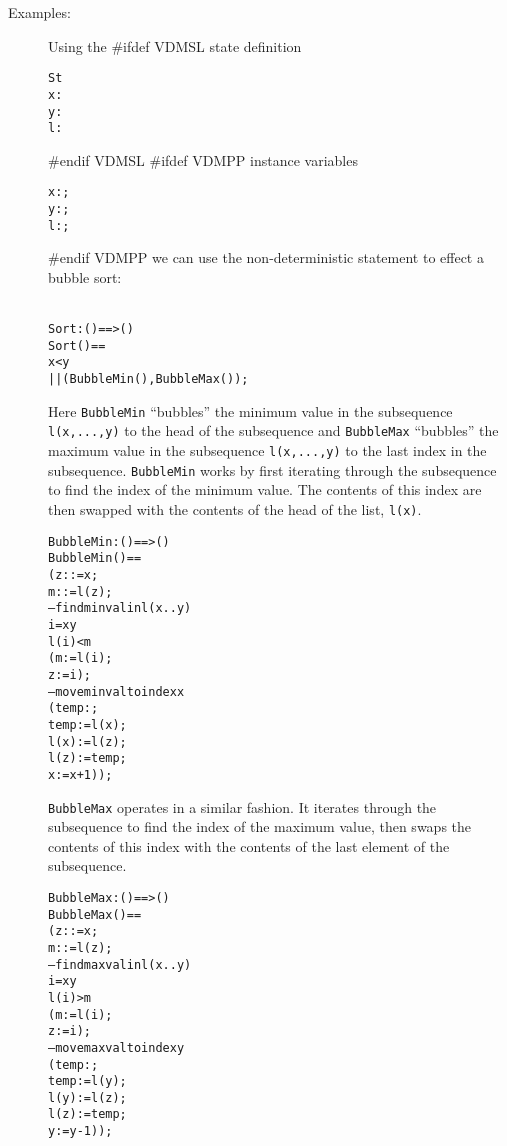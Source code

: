 \documentclass[\pformat,12pt]{article}
\begin{document}
\begin{description}
\item[Examples:] Using the 
#ifdef VDMSL
state definition
  \begin{alltt}
   St 
    x:
    y:
    l:
  \end{alltt}
#endif VDMSL
#ifdef VDMPP
instance variables
  \begin{alltt}
    x:;
    y:;
    l:;
  \end{alltt}
#endif VDMPP
  we can use the non-deterministic statement to effect a bubble sort:
  \begin{alltt}\label{sortDef}
  Sort: () ==> ()
  Sort () ==
     x < y 
      ||(BubbleMin(), BubbleMax());
  \end{alltt}
  Here \texttt{BubbleMin} ``bubbles'' the minimum value in the
  subsequence \texttt{l(x,...,y)} to the head of the subsequence and
  \texttt{BubbleMax} ``bubbles'' the maximum value in the subsequence
  \texttt{l(x,...,y)} to the last index in the
  subsequence. \texttt{BubbleMin} works by first iterating through the
  subsequence to find the index of the minimum value. The contents of
  this index are then swapped with the contents of the head of the
  list, \texttt{l(x)}.
  \begin{alltt}
  BubbleMin : () ==> ()
  BubbleMin () ==
    ( z: := x;
      m: := l(z);
     -- find min val in l(x..y)
      i = x  y 
        l(i) < m
        ( m := l(i);
              z := i);
     -- move min val to index x
     ( temp:;
      temp := l(x);
      l(x) := l(z);
      l(z) := temp;
      x := x+1));
\end{alltt}
\texttt{BubbleMax} operates in a similar fashion. It iterates through the
  subsequence to find the index of the maximum value, then swaps the
  contents of this index with the contents of the last element of the
  subsequence. 
\begin{alltt}
  BubbleMax : () ==> ()
  BubbleMax () ==
    ( z: := x;
      m: := l(z);
     -- find max val in l(x..y)
      i = x  y 
        l(i) > m
        ( m := l(i);
              z := i);
     -- move max val to index y
     ( temp:;
      temp := l(y);
      l(y) := l(z);
      l(z) := temp;
      y := y-1));
  \end{alltt}
\end{description}
\end{document}
